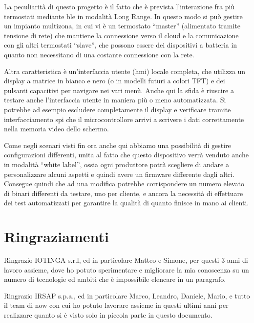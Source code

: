 \documentclass[12pt,a4paper,twoside,titlepage]{book}
\begin{document}
La peculiarità di questo progetto è il fatto che è prevista l'interazione fra più
termostati mediante \Gls{ble} in modalità Long Range. In questo modo
si può gestire un impianto multizona, in cui vi è un termostato ``master'' (alimentato
tramite tensione di rete) che mantiene la connessione verso il cloud e la comunicazione
con gli altri termostati ``slave'', che possono essere dei dispositivi a batteria
in quanto non necessitano di una costante connessione con la rete.

Altra caratteristica è un'interfaccia utente (\acrshort{hmi})
locale completa, che utilizza un display a matrice in bianco e nero (o in modelli
futuri a colori TFT) e dei pulsanti capacitivi per navigare nei vari menù. Anche
qui la sfida è riuscire a testare anche l'interfaccia utente in maniera più o meno
automatizzata. Si potrebbe ad esempio escludere completamente il display e verificare
tramite interfacciamento \Gls{spi} che il microcontrollore arrivi a scrivere i dati correttamente
nella memoria video dello schermo.

Come negli scenari visti fin ora anche qui abbiamo una possibilità di gestire configurazioni
differenti, unita al fatto che questo dispositivo verrà venduto anche in modalità ``white label'',
ossia ogni produttore potrà scegliere di andare a personalizzare alcuni aspetti e quindi
avere un \gls{firmware} differente dagli altri. Consegue quindi che ad una modifica potrebbe
corrispondere un numero elevato di binari differenti da testare, uno per cliente, e
ancora la necessità di effettuare dei test automatizzati per garantire la qualità di
quanto finisce in mano ai clienti.

\section{Ringraziamenti}

Ringrazio IOTINGA s.r.l, ed in particolare Matteo e Simone, per questi 3 anni di
lavoro assieme, dove ho potuto sperimentare e migliorare la mia conoscenza su un
numero di tecnologie ed ambiti che è impossibile elencare in un paragrafo.

Ringrazio IRSAP s.p.a., ed in particolare Marco, Leandro, Daniele, Mario, e tutto il team
di \Gls{now} con cui ho potuto lavorare assieme in questi ultimi anni per realizzare
quanto si è visto solo in piccola parte in questo documento.

\clearpage

\printglossary
\printglossary[type=\acronymtype]
\end{document}

